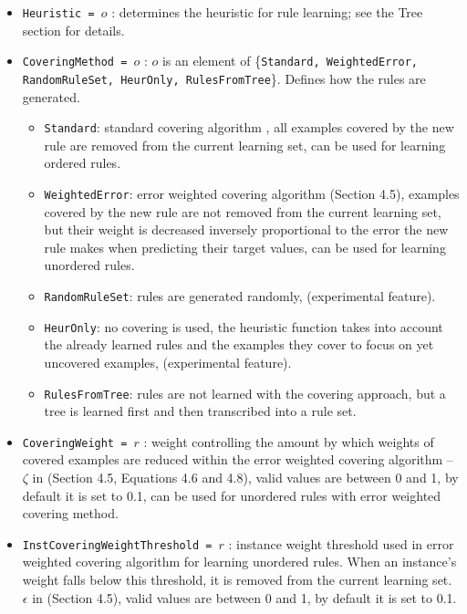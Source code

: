 \documentclass[a4paper]{report}
\begin{document}
\begin{itemize}
	\item \texttt{Heuristic = $o$} : determines the heuristic for rule learning; see the Tree section for details.
	\item \texttt{CoveringMethod = $o$} : $o$ is an element of \{\texttt{Standard, %
	WeightedError, %
	RandomRuleSet, %
	HeurOnly, RulesFromTree}\}. Defines how the rules are generated.
	\begin{itemize}
		\item \texttt{Standard}: standard covering algorithm \cite{Michalski1969}, all examples covered by the new rule are removed from the current learning set, can be used for learning ordered rules.
		\item \texttt{WeightedError}: error weighted covering algorithm \cite{Zenko07} (Section 4.5), examples covered by the new rule are not removed from the current learning set, but their weight is decreased inversely proportional to the error the new rule makes when predicting their target values, can be used for learning unordered rules.
		\item \texttt{RandomRuleSet}: rules are generated randomly, (experimental feature).
		\item \texttt{HeurOnly}: no covering is used, the heuristic function takes into account the already learned rules and the examples they cover to focus on yet uncovered examples, (experimental feature).
		\item \texttt{RulesFromTree}: rules are not learned with the covering approach, but a tree is learned first and then transcribed into a rule set.
	\end{itemize}
	\item \texttt{CoveringWeight = $r$} : weight controlling the amount by which weights of covered examples are reduced within the error weighted covering algorithm -- $\zeta$ in \cite{Zenko07} (Section 4.5, Equations 4.6 and 4.8), valid values are between 0 and 1, by default it is set to 0.1, can be used for unordered rules with error weighted covering method.
	\item \texttt{InstCoveringWeightThreshold = $r$} : instance weight threshold used in error weighted covering algorithm for learning unordered rules. When an instance's weight falls below this threshold, it is removed from the current learning set.  $\epsilon$ in \cite{Zenko07} (Section 4.5), valid values are between 0 and 1, by default it is set to 0.1.

\end{itemize}
\end{document}
